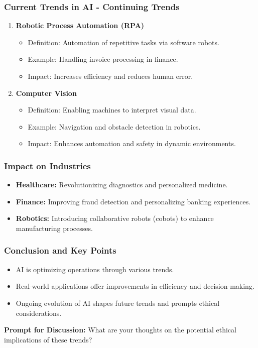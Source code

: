 \documentclass[aspectratio=169]{beamer}
\begin{document}
\begin{frame}[fragile]
    \frametitle{Current Trends in AI - Continuing Trends}
    \begin{enumerate}[resume]
        \item \textbf{Robotic Process Automation (RPA)}
            \begin{itemize}
                \item Definition: Automation of repetitive tasks via software robots.
                \item Example: Handling invoice processing in finance.
                \item Impact: Increases efficiency and reduces human error.
            \end{itemize}
        \item \textbf{Computer Vision}
            \begin{itemize}
                \item Definition: Enabling machines to interpret visual data.
                \item Example: Navigation and obstacle detection in robotics.
                \item Impact: Enhances automation and safety in dynamic environments.
            \end{itemize}
    \end{enumerate}
\end{frame}

\begin{frame}[fragile]
    \frametitle{Impact on Industries}
    \begin{itemize}
        \item \textbf{Healthcare:} Revolutionizing diagnostics and personalized medicine.
        \item \textbf{Finance:} Improving fraud detection and personalizing banking experiences.
        \item \textbf{Robotics:} Introducing collaborative robots (cobots) to enhance manufacturing processes.
    \end{itemize}
\end{frame}

\begin{frame}[fragile]
    \frametitle{Conclusion and Key Points}
    \begin{itemize}
        \item AI is optimizing operations through various trends.
        \item Real-world applications offer improvements in efficiency and decision-making.
        \item Ongoing evolution of AI shapes future trends and prompts ethical considerations.
    \end{itemize}
    \textbf{Prompt for Discussion:} What are your thoughts on the potential ethical implications of these trends?
\end{frame}
\end{document}
